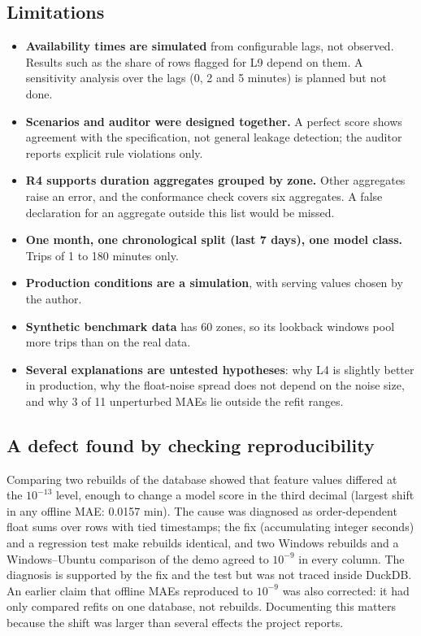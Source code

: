 \documentclass[11pt,a4paper]{article}
\begin{document}
\subsection{Limitations}
\begin{itemize}
  \item \textbf{Availability times are simulated} from configurable lags, not observed. Results such as the share of rows flagged for L9 depend on them. A sensitivity analysis over the lags (0, 2 and 5 minutes) is planned but not done.
  \item \textbf{Scenarios and auditor were designed together.} A perfect score shows agreement with the specification, not general leakage detection; the auditor reports explicit rule violations only.
  \item \textbf{R4 supports duration aggregates grouped by zone.} Other aggregates raise an error, and the conformance check covers six aggregates. A false declaration for an aggregate outside this list would be missed.
  \item \textbf{One month, one chronological split (last 7 days), one model class.} Trips of 1 to 180 minutes only.
  \item \textbf{Production conditions are a simulation}, with serving values chosen by the author.
  \item \textbf{Synthetic benchmark data} has 60 zones, so its lookback windows pool more trips than on the real data.
  \item \textbf{Several explanations are untested hypotheses}: why L4 is slightly better in production, why the float-noise spread does not depend on the noise size, and why 3 of 11 unperturbed MAEs lie outside the refit ranges.
\end{itemize}

\subsection{A defect found by checking reproducibility}\label{sec:defect}
Comparing two rebuilds of the database showed that feature values differed at the $10^{-13}$ level, enough to change a model score in the third decimal (largest shift in any offline MAE: 0.0157 min). The cause was diagnosed as order-dependent float sums over rows with tied timestamps; the fix (accumulating integer seconds) and a regression test make rebuilds identical, and two Windows rebuilds and a Windows--Ubuntu comparison of the demo agreed to $10^{-9}$ in every column. The diagnosis is supported by the fix and the test but was not traced inside DuckDB. An earlier claim that offline MAEs reproduced to $10^{-9}$ was also corrected: it had only compared refits on one database, not rebuilds. Documenting this matters because the shift was larger than several effects the project reports.
\end{document}
